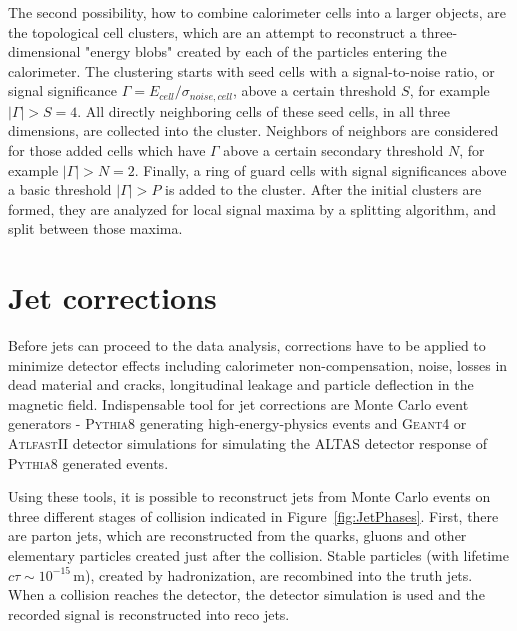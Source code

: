 The second possibility, how to combine calorimeter cells into a larger objects,
are the topological cell clusters, which are an attempt to reconstruct a
three-dimensional "energy blobs" created by each of the particles entering the
calorimeter.  The clustering starts with seed cells with a signal-to-noise
ratio, or signal significance $\Gamma = E_{cell} / \sigma_{noise,cell}$, above a
certain threshold $S$, for example $|\Gamma| > S = 4$.  All directly neighboring cells
of these seed cells, in all three dimensions, are collected into the cluster.
Neighbors of neighbors are considered for those added cells which have $\Gamma$
above a certain secondary threshold $N$, for example $|\Gamma| > N = 2$. Finally, a ring of
guard cells with signal significances above a basic threshold $|\Gamma| > P$ is
added to the cluster. After the initial clusters are formed, they are analyzed
for local signal maxima by a splitting algorithm, and split between those
maxima.

\section{Jet corrections}

Before jets can proceed to the data analysis, corrections have to be applied to
minimize detector effects including calorimeter non-compensation, noise, losses
in dead material and cracks, longitudinal leakage and particle deflection in the
magnetic field. Indispensable tool for jet corrections are Monte Carlo event
generators - \textsc{Pythia8} \cite{Pythia8} generating high-energy-physics
events and \textsc{Geant4} \cite{Geant4} or \textsc{AtlfastII} \cite{AtlfastII}
detector simulations for simulating the ALTAS detector response of
\textsc{Pythia8} generated events.

Using these tools, it is possible to reconstruct jets from Monte Carlo events on three
different stages of collision indicated in Figure~\ref{fig:JetPhases}. First,
there are parton jets, which are reconstructed from the quarks, gluons and other
elementary particles created just after the collision. Stable particles (with
lifetime $c\tau \sim 10^{-15}\,\text{m}$), created by hadronization, are recombined into
the truth jets. When a collision reaches the detector, the detector simulation
is used and the recorded signal is reconstructed into reco jets.

